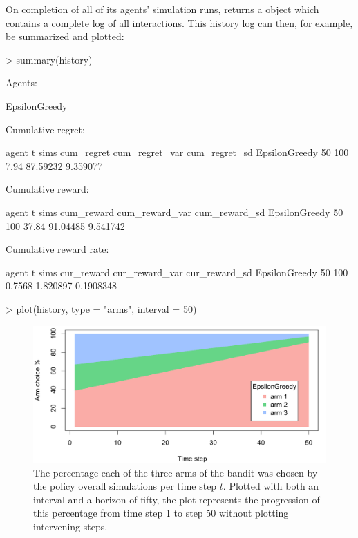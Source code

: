 \documentclass{jss}
\begin{document}
On completion of all of its agents' simulation runs,  returns a  object which contains a complete log of all interactions. This history log can then, for example, be summarized and plotted:

\begin{CodeChunk}
\begin{CodeInput}
> summary(history)
\end{CodeInput}
\begin{CodeOutput}
Agents:

  EpsilonGreedy

Cumulative regret:

         agent  t sims cum_regret cum_regret_var cum_regret_sd
 EpsilonGreedy 50  100       7.94       87.59232      9.359077


Cumulative reward:

         agent  t sims cum_reward cum_reward_var cum_reward_sd
 EpsilonGreedy 50  100      37.84       91.04485      9.541742


Cumulative reward rate:

         agent  t sims cur_reward cur_reward_var cur_reward_sd
 EpsilonGreedy 50  100     0.7568       1.820897     0.1908348
\end{CodeOutput}
\end{CodeChunk}

\begin{CodeChunk}
\begin{CodeInput}
> plot(history, type = "arms", interval = 50)
\end{CodeInput}
\end{CodeChunk}
\begin{figure}[H]
\centering
\includegraphics[width=.99\textwidth]{fig/section_2_3}
\caption{The percentage each of the three arms of the bandit was chosen by the policy overall simulations per time step $t$. Plotted with both an interval and a horizon of fifty, the plot represents the progression of this percentage from time step 1 to step 50 without plotting intervening steps.}
\label{fig:section_2_3}
\end{figure}
\end{document}
